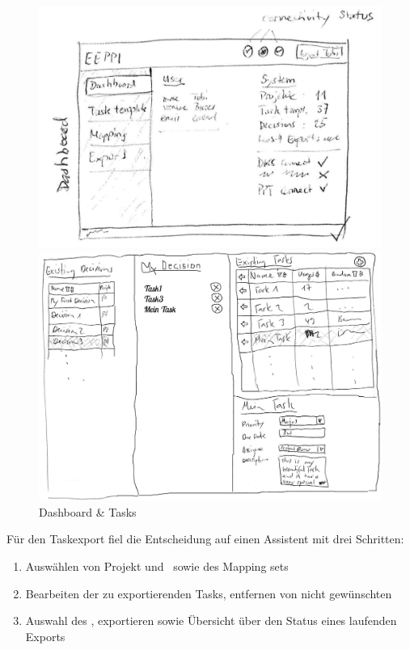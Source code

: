 		\begin{figure}[H]
			\begin{minipage}[b]{0.5\linewidth}
				\includegraphics[width=\linewidth]{interfacesAndProtocols/media/img/dashboard.jpg}
			\end{minipage}
			\begin{minipage}[b]{0.5\linewidth}	
				\includegraphics[width=\linewidth]{interfacesAndProtocols/media/img/tasks.jpg}
			\end{minipage}
			\caption{Dashboard \& Tasks}
			\label{fig:dashboardAndTasks}
		\end{figure}
		
		Für den Taskexport fiel die Entscheidung auf einen Assistent mit drei Schritten:
		\begin{enumerate}
			\item Auswählen von Projekt und \dks\ sowie des Mapping sets
			\item Bearbeiten der zu exportierenden Tasks, entfernen von nicht gewünschten
			\item Auswahl des \ppt, exportieren sowie Übersicht über den Status eines laufenden Exports
		\end{enumerate}
		
